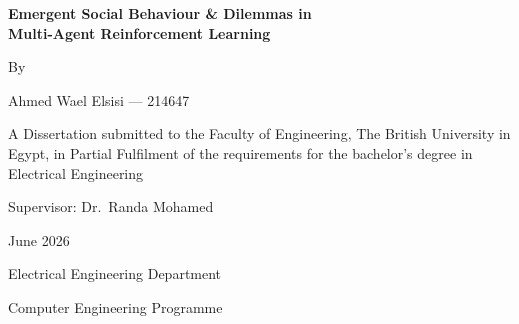 \documentclass[12pt,a4paper]{report}
\begin{document}
\begin{titlepage}
\centering
\vspace*{1.5cm}
{\LARGE\bfseries Emergent Social Behaviour \& Dilemmas in\\[0.3em]
Multi-Agent Reinforcement Learning\par}
\vspace{1.0cm}
{\large By\par}
\vspace{0.3cm}
{\large Ahmed Wael Elsisi --- 214647\par}
\vspace{1.5cm}
{\normalsize A Dissertation submitted to the Faculty of Engineering, The British
University in Egypt, in Partial Fulfilment of the requirements for the
bachelor's degree in Electrical Engineering\par}
\vspace{1.5cm}
{\large Supervisor: Dr.\ Randa Mohamed\par}
\vspace{2.0cm}
{\normalsize June 2026\par}
{\normalsize Electrical Engineering Department\par}
{\normalsize Computer Engineering Programme\par}
\vfill
\end{titlepage}



\tableofcontents
\listoffigures
\listoftables
\clearpage
{}












\end{document}
